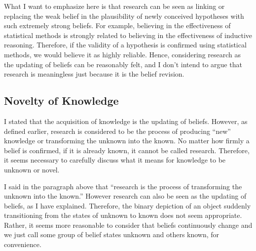 \documentclass{book}
\begin{document}

What I want to emphasize here is that research can be seen as linking or replacing the weak belief in the plausibility of newly conceived hypotheses with such extremely strong beliefs. For example, believing in the effectiveness of statistical methods is strongly related to believing in the effectiveness of inductive reasoning. Therefore, if the validity of a hypothesis is confirmed using statistical methods, we would believe it as highly reliable. Hence, considering research as the updating of beliefs can be reasonably felt, and I don't intend to argue that research is meaningless just because it is the belief revision. 

\subsection{Novelty of Knowledge}
I stated that the acquisition of knowledge is the updating of beliefs. However, as defined earlier, research is considered to be the process of producing ``new'' knowledge or transforming the unknown into the known. No matter how firmly a belief is confirmed, if it is already known, it cannot be called research. Therefore, it seems necessary to carefully discuss what it means for knowledge to be unknown or novel.

I said in the paragraph above that ``research is the process of transforming the unknown into the known.'' However research can also be seen as the updating of beliefs, as I have explained. Therefore, the binary depiction of an object suddenly transitioning from the states of unknown to known does not seem appropriate. Rather, it seems more reasonable to consider that beliefs continuously change and we just call some group of belief states unknown and others known, for convenience.
\end{document}

